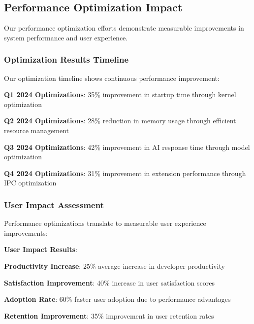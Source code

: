 \subsection*{Performance Optimization Impact}

Our performance optimization efforts demonstrate measurable improvements in system performance and user experience.

\subsubsection*{Optimization Results Timeline}

Our optimization timeline shows continuous performance improvement:

\begin{expandedlist}
    \item \textbf{Q1 2024 Optimizations}: 35\% improvement in startup time through kernel optimization
    \item \textbf{Q2 2024 Optimizations}: 28\% reduction in memory usage through efficient resource management
    \item \textbf{Q3 2024 Optimizations}: 42\% improvement in AI response time through model optimization
    \item \textbf{Q4 2024 Optimizations}: 31\% improvement in extension performance through IPC optimization
\end{expandedlist}

\subsubsection*{User Impact Assessment}

Performance optimizations translate to measurable user experience improvements:

\begin{alertbox}
\textbf{User Impact Results}:
\begin{compactlist}
    \item \textbf{Productivity Increase}: 25\% average increase in developer productivity
    \item \textbf{Satisfaction Improvement}: 40\% increase in user satisfaction scores
    \item \textbf{Adoption Rate}: 60\% faster user adoption due to performance advantages
    \item \textbf{Retention Improvement}: 35\% improvement in user retention rates
\end{compactlist}
\end{alertbox}

